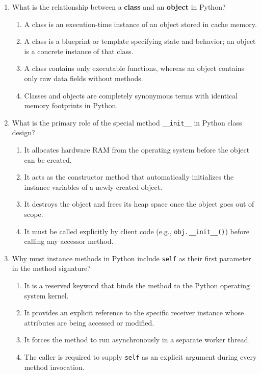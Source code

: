 \documentclass[11pt,a4paper]{article}
\begin{document}
\begin{enumerate}[label=\textbf{Q\arabic*.},leftmargin=2em,itemsep=1.5pt,topsep=1pt]
\item What is the relationship between a \textbf{class} and an \textbf{object} in Python?
\begin{enumerate}[label=\Alph*.,leftmargin=2em]
\item A class is an execution-time instance of an object stored in cache memory.
\item A class is a blueprint or template specifying state and behavior; an object is a concrete instance of that class.
\item A class contains only executable functions, whereas an object contains only raw data fields without methods.
\item Classes and objects are completely synonymous terms with identical memory footprints in Python.
\end{enumerate}
\item What is the primary role of the special method \texttt{\_\_init\_\_} in Python class design?
\begin{enumerate}[label=\Alph*.,leftmargin=2em]
\item It allocates hardware RAM from the operating system before the object can be created.
\item It acts as the constructor method that automatically initializes the instance variables of a newly created object.
\item It destroys the object and frees its heap space once the object goes out of scope.
\item It must be called explicitly by client code (e.g., \texttt{obj.\_\_init\_\_()}) before calling any accessor method.
\end{enumerate}
\item Why must instance methods in Python include \texttt{self} as their first parameter in the method signature?
\begin{enumerate}[label=\Alph*.,leftmargin=2em]
\item It is a reserved keyword that binds the method to the Python operating system kernel.
\item It provides an explicit reference to the specific receiver instance whose attributes are being accessed or modified.
\item It forces the method to run asynchronously in a separate worker thread.
\item The caller is required to supply \texttt{self} as an explicit argument during every method invocation.

\end{enumerate}
\end{enumerate}
\end{document}
